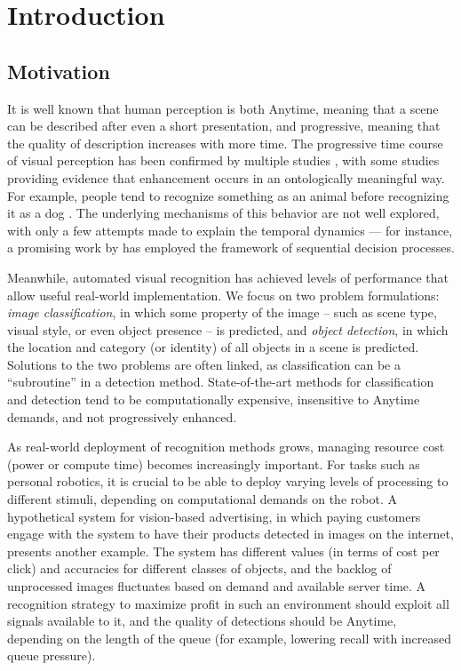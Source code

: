 \chapter{Introduction}\label{sec:introduction}

\section{Motivation}

It is well known that human perception is both Anytime, meaning that a scene can be described after even a short presentation, and progressive, meaning that the quality of description increases with more time.
The progressive time course of visual perception has been confirmed by multiple studies \parencite{Vanrullen-1996,Fei-Fei-Vision-2007}, with some studies providing evidence that enhancement occurs in an ontologically meaningful way.
For example, people tend to recognize something as an animal before recognizing it as a dog \parencite{Mace-PloS-2009}.
The underlying mechanisms of this behavior are not well explored, with only a few attempts made to explain the temporal dynamics --- for instance, a promising work by \cite{Hegde-Neuro-2008} has employed the framework of sequential decision processes.

Meanwhile, automated visual recognition has achieved levels of performance that allow useful real-world implementation.
We focus on two problem formulations: \emph{image classification}, in which some property of the image -- such as scene type, visual style, or even object presence -- is predicted, and \emph{object detection}, in which the location and category (or identity) of all objects in a scene is predicted.
Solutions to the two problems are often linked, as classification can be a ``subroutine'' in a detection method.
State-of-the-art methods for classification and detection tend to be computationally expensive, insensitive to Anytime demands, and not progressively enhanced.

As real-world deployment of recognition methods grows, managing resource cost (power or compute time) becomes increasingly important.
For tasks such as personal robotics, it is crucial to be able to deploy varying levels of processing to different stimuli, depending on computational demands on the robot.
A hypothetical system for vision-based advertising, in which paying customers engage with the system to have their products detected in images on the internet, presents another example.
The system has different values (in terms of cost per click) and accuracies for different classes of objects, and the backlog of unprocessed images fluctuates based on demand and available server time.
A recognition strategy to maximize profit in such an environment should exploit all signals available to it, and the quality of detections should be Anytime, depending on the length of the queue (for example, lowering recall with increased queue pressure).


